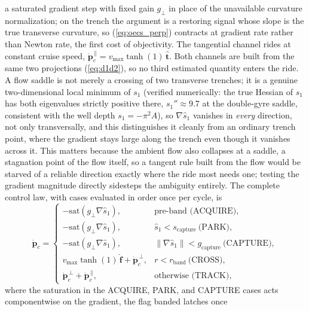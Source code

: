 \documentclass[lettersize,journal]{IEEEtran}
\begin{document}
a saturated gradient step with fixed gain $g_\perp$ in place of the
unavailable curvature normalization; on the trench the argument is a
restoring signal whose slope is the true transverse curvature, so
(\ref{eq:oecs_perp}) contracts at gradient rate rather than Newton
rate, the first cost of objectivity. The tangential channel rides at
constant cruise speed, $\dot{\mathbf{p}}_c^{\,\parallel} =
v_{\max}\tanh(1)\,\hat{\mathbf{t}}$. Both channels are built from the
same two projections (\ref{eq:d1d2}), so no third estimated quantity
enters the ride. A flow saddle is not merely a crossing of two
transverse trenches; it is a genuine two-dimensional local minimum of
$s_1$ (verified numerically: the true Hessian of $s_1$ has both
eigenvalues strictly positive there, $s_1'' \approx 9.7$ at the
double-gyre saddle, consistent with the well depth $s_1 = -\pi^2 A$),
so $\nabla\hat{s}_1$ vanishes in \emph{every} direction, not only
transversally, and this distinguishes it cleanly from an ordinary
trench point, where the gradient stays large along the trench even
though it vanishes across it. This matters because the ambient flow
also collapses at a saddle, a stagnation point of the flow itself, so a
tangent rule built from the flow would be starved of a reliable
direction exactly where the ride most needs one; testing the gradient
magnitude directly sidesteps the ambiguity entirely. The complete
control law, with cases evaluated in order once per cycle, is
\begin{equation}
    \dot{\mathbf{p}}_c =
    \begin{cases}
        -\mathrm{sat}(g_\perp\nabla\hat{s}_1), &
            \text{pre-band (ACQUIRE)}, \\[1pt]
        -\mathrm{sat}(g_\perp\nabla\hat{s}_1), &
            \hat{s}_1 < s_{\text{capture}}\ \text{(PARK)}, \\[1pt]
        -\mathrm{sat}(g_\perp\nabla\hat{s}_1), &
            \lVert\nabla\hat{s}_1\rVert < g_{\text{capture}}\
            \text{(CAPTURE)}, \\[1pt]
        v_{\max}\tanh(1)\,\hat{\mathbf{f}} + \dot{\mathbf{p}}_c^{\,\perp},
            & r < r_{\text{band}}\ \text{(CROSS)}, \\[1pt]
        \dot{\mathbf{p}}_c^{\,\perp} +
            \dot{\mathbf{p}}_c^{\,\parallel}, &
            \text{otherwise (TRACK)},
    \end{cases}
    \label{eq:oecs_selector}
\end{equation}
where the saturation in the ACQUIRE, PARK, and CAPTURE cases acts
componentwise on the gradient, the flag banded latches once
\end{document}
